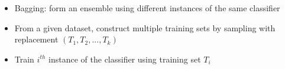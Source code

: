\begin{frame}
	\begin{columns}
		\begin{overlayarea}{\textwidth}{\textheight}
					
		\end{overlayarea}
		\begin{overlayarea}{\textwidth}{\textheight}
			\begin{itemize}
				\justifying
				\item {}  Bagging: form an ensemble using different instances of the same classifier
				\item {} From a given dataset, construct multiple training sets by sampling with replacement $(T_1, T_2, ... ,T_k)$
				\item {} Train $i^{th}$ instance of the classifier using training set $T_i$
			\end{itemize}
		\end{overlayarea}
	\end{columns}
\end{frame}

